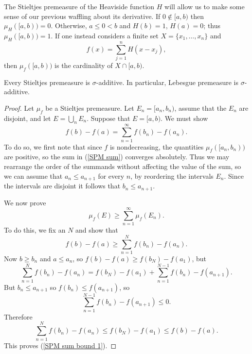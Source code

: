 \begin{example}
The Stieltjes premeasure of the Heaviside function $H$ will allow us to make some sense of our previous waffling about its derivative.
If $0 \notin [a, b)$ then $\mu_{H}([a, b)) = 0$.
Otherwise, $a \leq 0 < b$ and $H(b) = 1$, $H(a) = 0$; thus $\mu_{H}([a, b)) = 1$.
If one instead considers a finite set $X = \{x_{1}, \dots, x_{n}\}$ and
\[f(x) = \sum_{j=1}^{n} H(x - x_{j}),\]
then $\mu_{f}([a, b))$ is the cardinality of $X \cap [a, b)$.
\end{example}

\begin{theorem}
Every Stieltjes premeasure is $\sigma$-additive.
In particular, Lebesgue premeasure is $\sigma$-additive.
\end{theorem}
\begin{proof}
Let $\mu_{f}$ be a Stieltjes premeasure.
Let $E_{n} = [a_{n}, b_{n})$, assume that the $E_{n}$ are disjoint, and let $E = \bigcup_{n} E_{n}$.
Suppose that $E = [a, b)$. We must show
\begin{equation}\label{SPM sum}
f(b) - f(a) = \sum_{n=1}^{\infty} f(b_{n}) - f(a_{n}).
\end{equation}
To do so, we first note that since $f$ is nondecreasing, the quantities $\mu_{f}([a_{n}, b_{n}))$ are positive, so the sum in (\ref{SPM sum}) converges absolutely.
Thus we may rearrange the order of the summands without affecting the value of the sum, so we can assume that $a_{n} \leq a_{n+1}$ for every $n$, by reordering the intervals $E_{n}$.
Since the intervals are disjoint it follows that $b_{n} \leq a_{n+1}$.

We now prove
\[\mu_{f}(E) \geq \sum_{n=1}^{\infty} \mu_{f}(E_{n}).\]
To do this, we fix an $N$ and show that
\begin{equation}\label{SPM sum bound 1}
f(b) - f(a) \geq \sum_{n=1}^{N} f(b_{n}) - f(a_{n}).
\end{equation}
Now $b \geq b_{n}$ and $a \leq a_{n}$, so $f(b) - f(a) \geq f(b_{N}) - f(a_{1})$, but
\[\sum_{n=1}^{N} f(b_{n}) - f(a_{n}) = f(b_{N}) - f(a_{1}) + \sum_{n=1}^{N-1} f(b_{n}) - f(a_{n+1}).\]
But $b_{n} \leq a_{n+1}$ so $f(b_{n}) \leq f(a_{n+1})$, so
\[\sum_{n=1}^{N-1} f(b_{n}) - f(a_{n+1}) \leq 0.\]
Therefore
\[\sum_{n=1}^{N} f(b_{n}) - f(a_{n}) \leq f(b_{N}) - f(a_{1}) \leq f(b) - f(a).\]
This proves (\ref{SPM sum bound 1}).


\end{proof}
